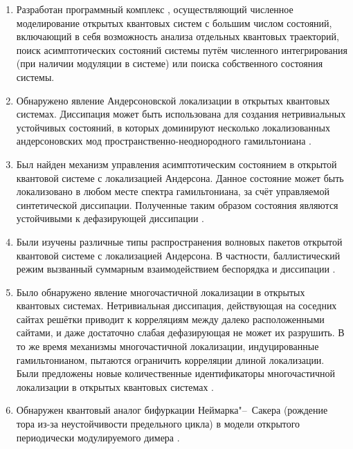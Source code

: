\begin{enumerate}[beginpenalty=10000] %
	\item Разработан программный комплекс \cite{prog1}, осуществляющий численное моделирование открытых квантовых систем с большим числом состояний, включающий в себя возможность анализа отдельных квантовых траекторий, поиск асимптотических состояний системы путём численного интегрирования (при наличии модуляции в системе) или поиска собственного состояния системы.
	\item Обнаружено явление Андерсоновской локализации в открытых квантовых системах. Диссипация может быть использована для создания нетривиальных устойчивых состояний, в которых доминируют несколько локализованных андерсоновских мод пространственно-неоднородного гамильтониана \cite{Yusipov2017}.
	\item Был найден механизм управления асимптотическим состоянием в открытой квантовой системе с локализацией Андерсона. Данное состояние может быть локализовано в любом месте спектра гамильтониана, за счёт управляемой синтетической диссипации. Полученные таким образом состояния являются устойчивыми к дефазирующей диссипации \cite{Vershinina2017}.
	\item Были изучены различные типы распространения волновых пакетов открытой квантовой системе с локализацией Андерсона. В частности, баллистический режим вызванный суммарным взаимодействием беспорядка и диссипации \cite{Yusipov2018}. 
	\item Было обнаружено явление многочастичной локализации в открытых квантовых системах.
	Нетривиальная диссипация, действующая на соседних сайтах решётки приводит к корреляциям между далеко расположенными сайтами, и  даже достаточно слабая дефазирующая не может их разрушить. 
	В то же время механизмы многочастичной локализации, индуцированные гамильтонианом, пытаются ограничить корреляции длиной локализации. Были предложены новые количественные идентификаторы многочастичной локализации в открытых квантовых системах \cite{Vakulchyk2018}.
	\item Обнаружен квантовый аналог бифуркации Неймарка"--~Сакера (рождение тора из-за неустойчивости предельного цикла) в модели открытого периодически модулируемого димера \cite{Yusipov2019_1}.

\end{enumerate}

